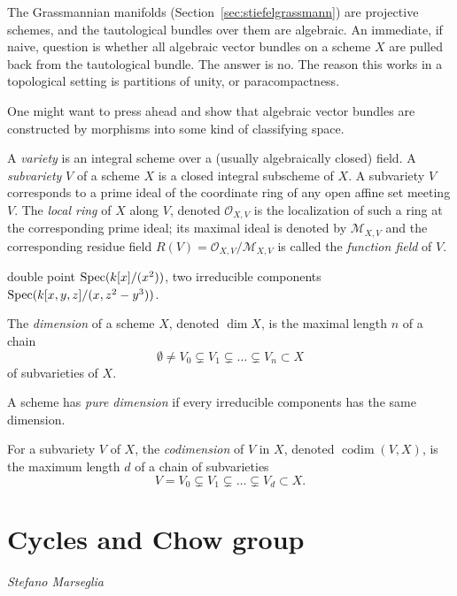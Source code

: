 \documentclass[a4paper,openany]{scrbook}
\DeclareMathOperator{\codim}{codim}
\newcommand{\chapterauthor}[1]{\hfill\emph{#1}\par\noindent}
\begin{document}
\begin{example}
The Grassmannian manifolds (Section~\ref{sec:stiefelgrassmann}) are projective schemes, and the tautological bundles over them are algebraic. An immediate, if naive, question is whether all algebraic vector bundles on a scheme $X$ are pulled back from the tautological bundle. The answer is no. The reason this works in a topological setting is partitions of unity, or paracompactness. 
\end{example}

One might want to press ahead and show that algebraic vector bundles are constructed by morphisms into some kind of classifying space. 

A \emph{variety} is an integral scheme over a (usually algebraically closed) field. A \emph{subvariety} $V$ of a scheme $X$ is a closed integral subscheme of $X$. A subvariety $V$ corresponds to a prime ideal of the coordinate ring of any open affine set meeting $V$. The \emph{local ring} of $X$ along $V$, denoted $\mathcal O_{X,V}$ is the localization of such a ring at the corresponding prime ideal; its maximal ideal is denoted by $\mathcal M_{X,V}$ and the corresponding residue field $R(V)=\mathcal O_{X,V}/\mathcal M_{X,V}$ is called the \emph{function field} of $V$. 

\begin{example} 
double point $\operatorname{Spec}(k[x]/(x^2))$, two irreducible components $\operatorname{Spec}(k[x,y,z]/(x,z^2-y^3))$.
\end{example}

\begin{defn}
The \emph{dimension} of a scheme $X$, denoted $\dim X$, is the maximal length $n$ of a chain
\[
\emptyset \neq V_0 \subsetneq V_1\subsetneq \ldots \subsetneq V_n\subset X
\]
of subvarieties of $X$.

A scheme has \emph{pure dimension} if every irreducible components has the same dimension.

For a subvariety $V$ of $X$, the \emph{codimension} of $V$ in $X$, denoted $\codim(V,X)$, is the maximum length $d$ of a chain of subvarieties
\[
V=V_0\subsetneq V_1\subsetneq \ldots \subsetneq V_d\subset X.
\]
\end{defn}

\section{Cycles and Chow group}
\chapterauthor{Stefano Marseglia}
\end{document}
